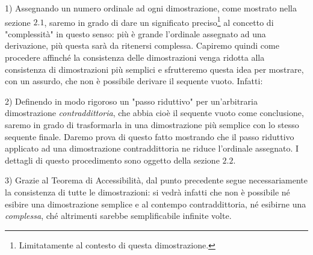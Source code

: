 		1) Assegnando un numero ordinale ad ogni dimostrazione, come mostrato nella sezione $2.1$, saremo in grado di dare un significato preciso\footnote{Limitatamente al contesto di questa dimostrazione.} al concetto di "complessità" in questo senso: più è grande l'ordinale assegnato ad una derivazione, più questa sarà da ritenersi complessa. Capiremo quindi come procedere affinché la consistenza delle dimostrazioni venga ridotta alla consistenza di dimostrazioni più semplici e sfrutteremo questa idea per mostrare, con un assurdo, che non è possibile derivare il sequente vuoto. Infatti:
		
		2) Definendo in modo rigoroso un "passo riduttivo" per un'arbitraria dimostrazione \emph{contraddittoria}, che abbia cioè il sequente vuoto come conclusione, saremo in grado di trasformarla in una dimostrazione più semplice con lo stesso sequente finale. Daremo prova di questo fatto mostrando che il passo riduttivo applicato ad una dimostrazione contraddittoria ne riduce l'ordinale assegnato. I dettagli di questo procedimento sono oggetto della sezione $2.2$. 
		 
		3) Grazie al Teorema di Accessibilità, dal punto precedente segue necessariamente la consistenza di tutte le dimostrazioni: si vedrà infatti che non è possibile né esibire una dimostrazione semplice e al contempo contraddittoria, né esibirne una \emph{complessa}, ché altrimenti sarebbe semplificabile infinite volte.
		
